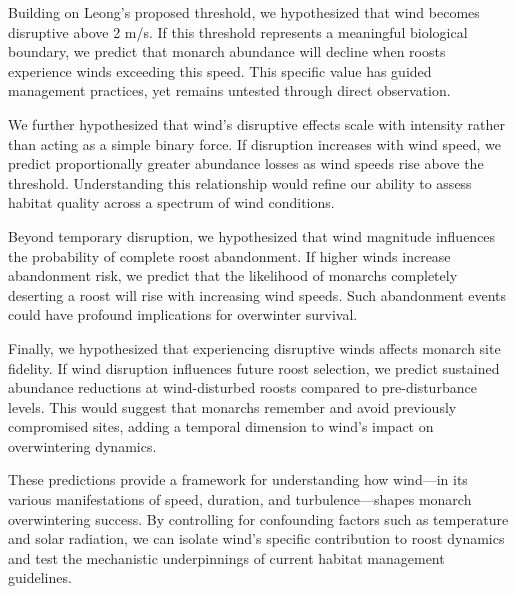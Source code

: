 Building on Leong's proposed threshold, we hypothesized that wind becomes disruptive above 2 m/s. If this threshold represents a meaningful biological boundary, we predict that monarch abundance will decline when roosts experience winds exceeding this speed. This specific value has guided management practices, yet remains untested through direct observation.

We further hypothesized that wind's disruptive effects scale with intensity rather than acting as a simple binary force. If disruption increases with wind speed, we predict proportionally greater abundance losses as wind speeds rise above the threshold. Understanding this relationship would refine our ability to assess habitat quality across a spectrum of wind conditions.

Beyond temporary disruption, we hypothesized that wind magnitude influences the probability of complete roost abandonment. If higher winds increase abandonment risk, we predict that the likelihood of monarchs completely deserting a roost will rise with increasing wind speeds. Such abandonment events could have profound implications for overwinter survival.

Finally, we hypothesized that experiencing disruptive winds affects monarch site fidelity. If wind disruption influences future roost selection, we predict sustained abundance reductions at wind-disturbed roosts compared to pre-disturbance levels. This would suggest that monarchs remember and avoid previously compromised sites, adding a temporal dimension to wind's impact on overwintering dynamics.

These predictions provide a framework for understanding how wind—in its various manifestations of speed, duration, and turbulence—shapes monarch overwintering success. By controlling for confounding factors such as temperature and solar radiation, we can isolate wind's specific contribution to roost dynamics and test the mechanistic underpinnings of current habitat management guidelines.